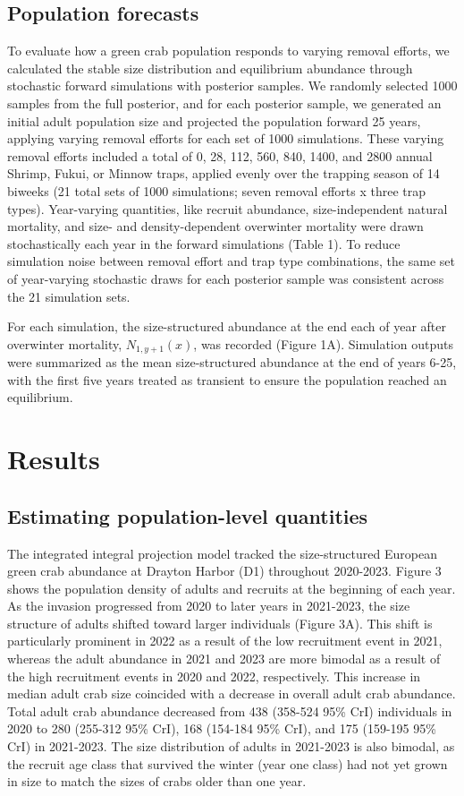 \documentclass{article}
\begin{document}
\subsection{Population forecasts}

To evaluate how a green crab population responds to varying removal efforts, we calculated the stable size distribution and equilibrium abundance through stochastic forward simulations with posterior samples. We randomly selected 1000 samples from the full posterior, and for each posterior sample, we generated an initial adult population size and projected the population forward 25 years, applying varying removal efforts for each set of 1000 simulations. These varying removal efforts included a total of 0, 28, 112, 560, 840, 1400, and 2800 annual Shrimp, Fukui, or Minnow traps, applied evenly over the trapping season of 14 biweeks (21 total sets of 1000 simulations; seven removal efforts x three trap types). Year-varying quantities, like recruit abundance, size-independent natural mortality, and size- and density-dependent overwinter mortality were drawn stochastically each year in the forward simulations (Table 1). To reduce simulation noise between removal effort and trap type combinations, the same set of year-varying stochastic draws for each posterior sample was consistent across the 21 simulation sets. 

For each simulation, the size-structured abundance at the end each of year after overwinter mortality, $N_{1,y+1}(x)$, was recorded (Figure 1A). Simulation outputs were summarized as the mean size-structured abundance at the end of years 6-25, with the first five years treated as transient to ensure the population reached an equilibrium.

\section{Results}

\subsection{Estimating population-level quantities}

The integrated integral projection model tracked the size-structured European green crab abundance at Drayton Harbor (D1) throughout 2020-2023. Figure 3 shows the population density of adults and recruits at the beginning of each year. As the invasion progressed from 2020 to later years in 2021-2023, the size structure of adults shifted toward larger individuals (Figure 3A). This shift is particularly prominent in 2022 as a result of the low recruitment event in 2021, whereas the adult abundance in 2021 and 2023 are more bimodal as a result of the high recruitment events in 2020 and 2022, respectively. This increase in median adult crab size coincided with a decrease in overall adult crab abundance. Total adult crab abundance decreased from 438 (358-524 95\% CrI) individuals in 2020 to 280 (255-312 95\% CrI), 168 (154-184 95\% CrI), and 175 (159-195 95\% CrI) in 2021-2023. The size distribution of adults in 2021-2023 is also bimodal, as the recruit age class that survived the winter (year one class) had not yet grown in size to match the sizes of crabs older than one year.
\end{document}
